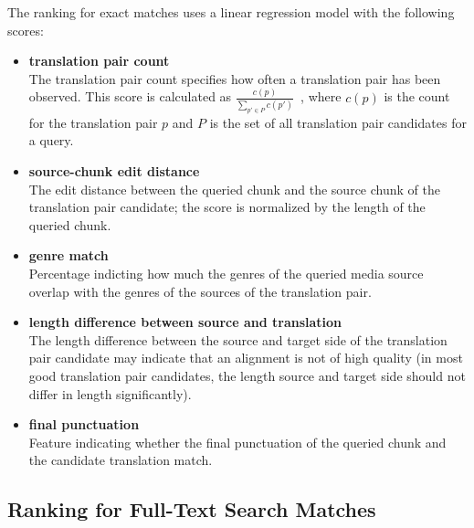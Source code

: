 The ranking for exact matches uses a linear regression model with the following scores:

\begin{itemize}
	\item \textbf{translation pair count}\\
	The translation pair count specifies how often a translation pair has been observed. This score is calculated as $\frac{c(p)}{ \sum_{p' \in P}{c(p')}  } $\ , where $c(p)$ is the count for the translation pair $p$ and $P$ is the set of all translation pair candidates for a query.
	
	\item \textbf{source-chunk edit distance}\\
	The edit distance between the queried chunk and the source chunk of the translation pair candidate; the score is normalized by the length of the queried chunk.
	
	\item \textbf{genre match}\\
	Percentage indicting how much the genres of the queried media source overlap with the genres of the sources of the translation pair.

	\item \textbf{length difference between source and translation}\\
	The length difference between the source and target side of the translation pair candidate may indicate that an alignment is not of high quality (in most good translation pair candidates,  the length source and target side should not differ in length significantly).
	
	\item \textbf{final punctuation}\\
	Feature indicating whether the final punctuation of the queried chunk and the candidate translation match.
	
	
	
\end{itemize}



\subsection{Ranking for Full-Text Search Matches}



